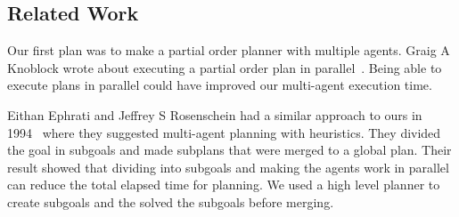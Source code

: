 \subsection{Related Work}
\label{sec:related work}
Our first plan was to make a partial order planner with multiple agents.
Graig A Knoblock wrote about executing a partial order plan in parallel~\cite{knoblock1994generating}.
Being able to execute plans in parallel could have improved our multi-agent execution time.

Eithan Ephrati and Jeffrey S Rosenschein had a similar approach to ours in 1994~\cite{ephrati1994divide} where they suggested multi-agent planning with heuristics.
They divided the goal in subgoals and made subplans that were merged to a global plan.
Their result showed that dividing into subgoals and making the agents work in parallel can reduce the total elapsed time for planning.
We used a high level planner to create subgoals and the solved the subgoals before merging.




